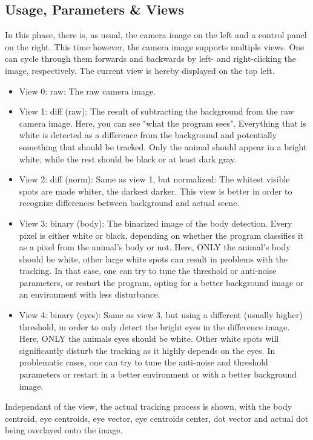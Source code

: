 \documentclass[12pt]{article}
\begin{document}
\subsection{Usage, Parameters \& Views}
In this phase, there is, as usual, the camera image on the left and a control panel on the right. This time however, the camera image supports multiple views. One can cycle through them forwards and backwards by left- and right-clicking the image, respectively. The current view is hereby displayed on the top left.
\begin{itemize}
	\item View 0: raw: The raw camera image.
	\item View 1: diff (raw): The result of subtracting the background from the raw camera image. Here, you can see "what the program sees". Everything that is white is detected as a difference from the background and potentially something that should be tracked. Only the animal should appear in a bright white, while the rest should be black or at least dark gray.
	\item View 2: diff (norm): Same as view 1, but normalized: The whitest visible spots are made whiter, the darkest darker. This view is better in order to recognize differences between background and actual scene.
	\item View 3: binary (body): The binarized image of the body detection. Every pixel is either white or black, depending on whether the program classifies it as a pixel from the animal's body or not. Here, ONLY the animal's body should be white, other large white spots can result in problems with the tracking. In that case, one can try to tune the threshold or anti-noise parameters, or restart the program, opting for a better background image or an environment with less disturbance.
	\item View 4: binary (eyes): Same as view 3, but using a different (usually higher) threshold, in order to only detect the bright eyes in the difference image. Here, ONLY the animals eyes should be white. Other white spots will significantly disturb the tracking as it highly depends on the eyes. In problematic cases, one can try to tune the anti-noise and threshold parameters or restart in a better environment or with a better background image.
\end{itemize}
Independant of the view, the actual tracking process is shown, with the body centroid, eye centroids, eye vector, eye centroids center, dot vector and actual dot being overlayed onto the image.
\end{document}

